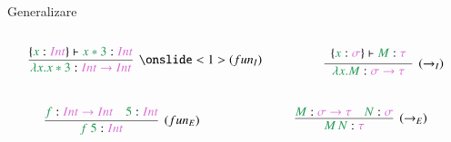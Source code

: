 \documentclass[xcolor=pdftex,romanian,colorlinks]{beamer}
\begin{document}
\begin{frame}{Generalizare}

\begin{columns}
\begin{column}{0.4\textwidth}
\vspace{-.4cm}
\[
\infer[\onslide<1>{(fun_I)}]
	{{\color{True}\lambda x.x * 3} : \sel{Int \to Int}}
	{
	\{{\color{True}x} : \sel{Int}\} \vdash {\color{True}x * 3} : \sel{Int} 
	}
 \vspace{.35cm}
\]
\end{column}
\begin{column}{0.4\textwidth}
\[
\infer[(\to_{I})]
	{{\color{True}\lambda x.M} : \sel{\sigma \to \tau}}
	{
	\begin{array}{c}
	\{{\color{True}x} : \sel{\sigma}\} \vdash {\color{True}M} : \sel{\tau} \\
	\end{array}
	}
\]
\end{column}
\end{columns}

 \vspace{.6cm}

\begin{columns}
\begin{column}{0.4\textwidth}
\vspace{-.4cm}
\[
\infer[(fun_E)]
	{{\color{True}f\ 5} : \sel{Int}}
	{{\color{True}f} : \sel{Int \to Int} \quad {\color{True}5} : \sel{Int}}
\]
\end{column}
\begin{column}{0.4\textwidth}
\[
\infer[(\to_E)]
	{{\color{True}\app{M}{N}} : \sel{\tau}}
	{{\color{True}M} : \sel{\sigma \to \tau} \quad {\color{True}N} : \sel{\sigma}}
\]
\end{column}
\end{columns}

\end{frame}
\end{document}

